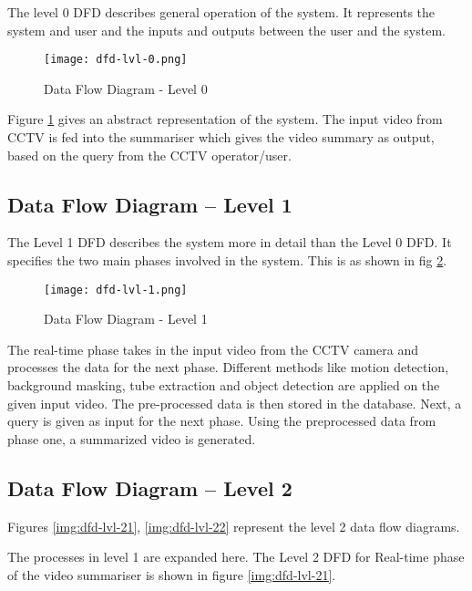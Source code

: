     The level 0 DFD describes general operation of the system. It represents the
    system and user and the inputs and outputs between the user and the system.

    \begin{figure}[H]
        \centering
        \texttt{[image: dfd-lvl-0.png]}
        \caption{Data Flow Diagram - Level 0 }
        \label{img:dfd-lvl-0}
    \end{figure}

    Figure \ref{img:dfd-lvl-0} gives an abstract representation of the system.
    The input video from CCTV is fed into the summariser which gives the video
    summary as output, based on the query from the CCTV operator/user.


    \subsection{Data Flow Diagram – Level 1}

    The Level 1 DFD describes the system more in detail than the Level 0 DFD.
    It specifies the two main phases involved in the system. This is as shown
    in fig \ref{img:dfd-lvl-1}.

    \begin{figure}[H]
        \centering
        \texttt{[image: dfd-lvl-1.png]}
        \caption{Data Flow Diagram - Level 1 }
        \label{img:dfd-lvl-1}
    \end{figure}

    The real-time phase takes in the input video from the CCTV camera and
    processes the data for the next phase. Different methods like motion
    detection, background masking, tube extraction and object detection are
    applied on the given input video. The pre-processed data is then stored in
    the database. Next, a query is given as input for the next phase. Using the
    preprocessed data from phase one, a summarized video is generated.

    \subsection{Data Flow Diagram – Level 2}

    Figures \ref{img:dfd-lvl-21}, \ref{img:dfd-lvl-22} represent the level 2
    data flow diagrams.

    The processes in level 1 are expanded here. The Level 2 DFD for Real-time
    phase of the video summariser is shown in figure \ref{img:dfd-lvl-21}.

